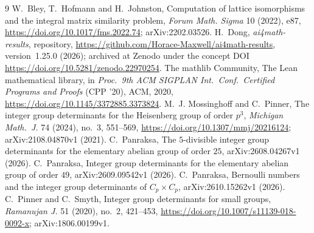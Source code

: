 \documentclass[11pt]{article}
\theoremstyle{definition}
\theoremstyle{remark}
\newcommand{\repoversion}{1.25.0}
\begin{document}
{\small
\begin{thebibliography}{9}
\setlength{\itemsep}{1pt}
 W.~Bley, T.~Hofmann and H.~Johnston, Computation of lattice
isomorphisms and the integral matrix similarity problem, \emph{Forum Math.
Sigma} 10 (2022), e87, \url{https://doi.org/10.1017/fms.2022.74};
arXiv:2202.03526.
 H.~Dong, \emph{ai4math-results}, repository,
\url{https://github.com/Horace-Maxwell/ai4math-results}, version~\repoversion{}
(2026); archived at Zenodo under the concept DOI
\url{https://doi.org/10.5281/zenodo.22970254}.
The mathlib Community, The Lean mathematical library, in \emph{Proc.\ 9th ACM
SIGPLAN Int.\ Conf.\ Certified Programs and Proofs} (CPP '20), ACM, 2020,
\url{https://doi.org/10.1145/3372885.3373824}.
 M.~J. Mossinghoff and C.~Pinner, The integer group determinants
for the Heisenberg group of order $p^3$, \emph{Michigan Math.\ J.} 74 (2024),
no.~3, 551--569, \url{https://doi.org/10.1307/mmj/20216124};
arXiv:2108.04870v1 (2021).
 C.~Panraksa, The $5$-divisible integer group determinants for
the elementary abelian group of order $25$, arXiv:2608.04267v1 (2026).
 C.~Panraksa, Integer group determinants for the elementary
abelian group of order $49$, arXiv:2609.09542v1 (2026).
 C.~Panraksa, Bernoulli numbers and the integer group
determinants of $C_p\times C_p$, arXiv:2610.15262v1 (2026).
 C.~Pinner and C.~Smyth, Integer group determinants for small
groups, \emph{Ramanujan J.} 51 (2020), no.~2, 421--453,
\url{https://doi.org/10.1007/s11139-018-0092-x}; arXiv:1806.00199v1.
\end{thebibliography}}
\end{document}
